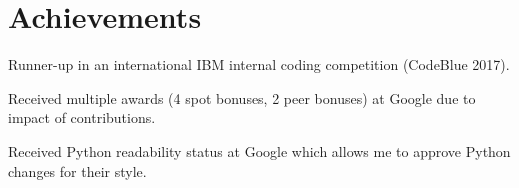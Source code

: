 \documentclass[a4paper]{article}
\newcommand{\resumeitemstartlist}{\begin{itemize}[leftmargin=*]}
\newcommand{\resumeitemendlist}{\end{itemize}\vspace{2pt}}
\newcommand{\resumeitem}[1]{%
  \item{\normalsize{#1\vspace{-4pt}}}%
}
\begin{document}

\section{Achievements}
\resumeitemstartlist
{%
  \resumeitem{%
    Runner-up in an international IBM internal coding competition (CodeBlue 2017).
  }
  \resumeitem{%
    Received multiple awards (4 spot bonuses, 2 peer bonuses) at Google due to impact of contributions.
  }
  \resumeitem{%
    Received Python readability status at Google which allows me to approve Python changes for their style.
  }
  \iftoggle{preuni}{%
    \resumeitem{%
      Campaign Medal from serving in Afghanistan in 2008 with the Canadian Military.
    }
    \resumeitem{%
      Hosted a tour and travel TV show in Indonesia with over 1,000,000 viewers.
    }
  }{}
}
\resumeitemendlist
\end{document}
